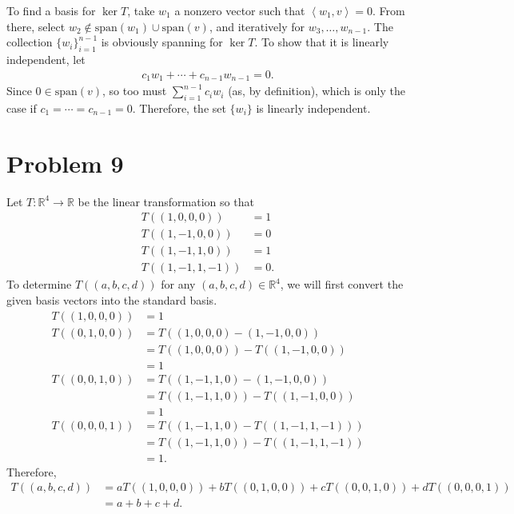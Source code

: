 \documentclass[8pt]{extarticle}
\newcommand{\R}{\mathbb{R}}
\newcommand{\iprod}[2]{\left\langle #1,#2\right\rangle}
\begin{document}
  To find a basis for $\ker T$, take $w_1$ a nonzero vector such that $\iprod{w_1}{v} = 0$. From there, select $w_2\notin \text{span}(w_1)\cup \text{span}(v)$, and iteratively for $w_3,\dots,w_{n-1}$. The collection $\{w_i\}_{i=1}^{n-1}$ is obviously spanning for $\ker T$. To show that it is linearly independent, let
  \begin{align*}
    c_1w_1 + \cdots + c_{n-1}w_{n-1} = 0.
  \end{align*}
  Since $0\in \text{span}(v)$, so too must $\sum_{i=1}^{n-1} c_iw_i$ (as, by definition), which is only the case if $c_1 = \cdots = c_{n-1} = 0$. Therefore, the set $\{w_i\}$ is linearly independent.
  \section{Problem 9}%
  Let $T: \R^4 \rightarrow \R$ be the linear transformation so that
  \begin{align*}
    T((1,0,0,0)) &= 1\\
    T((1,-1,0,0)) &= 0\\
    T((1,-1,1,0)) &= 1\\
    T((1,-1,1,-1)) &= 0.
  \end{align*}
  To determine $T((a,b,c,d))$ for any $(a,b,c,d)\in \R^4$, we will first convert the given basis vectors into the standard basis.
  \begin{align*}
    T((1,0,0,0)) &= 1\\
    T((0,1,0,0)) &= T((1,0,0,0) - (1,-1,0,0))\\
                 &= T((1,0,0,0)) - T((1,-1,0,0)) \\
                 &= 1\\
    T((0,0,1,0)) &= T((1,-1,1,0) - (1,-1,0,0))\\
                 &= T((1,-1,1,0)) - T((1,-1,0,0))\\
                 &= 1\\
    T((0,0,0,1)) &= T((1,-1,1,0) - T((1,-1,1,-1)))\\
                 &= T((1,-1,1,0)) - T((1,-1,1,-1))\\
                 &= 1.
  \end{align*}
  Therefore,
  \begin{align*}
    T((a,b,c,d)) &= aT((1,0,0,0)) + bT((0,1,0,0)) + cT((0,0,1,0)) + dT((0,0,0,1))\\
                 &= a + b + c + d.
  \end{align*}
\end{document}
